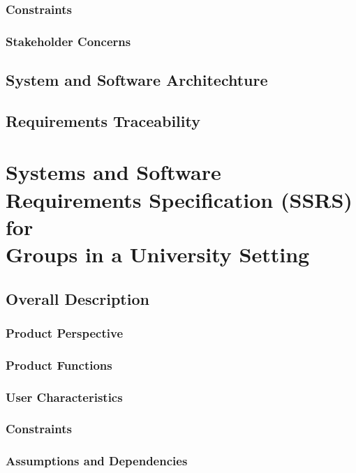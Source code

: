 \documentclass[12pt, oneside, letterpaper]{report}
\begin{document}
	\section{Constraints}
		
	\section{Stakeholder Concerns}
		

\chapter{System and Software Architechture}
		

\chapter{Requirements Traceability}
		

\part{Systems and Software Requirements Specification (SSRS) \\ for \\ Groups in a University Setting}
\chapter{Overall Description}
	\section{Product Perspective}
		
	\section{Product Functions}
		
	\section{User Characteristics}
		
	\section{Constraints}
		
	\section{Assumptions and Dependencies}
		
\end{document}
